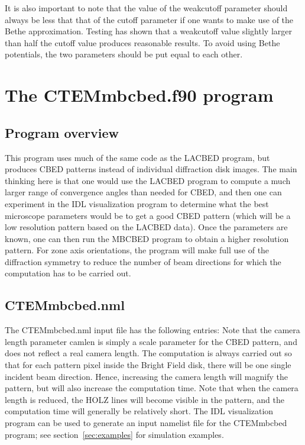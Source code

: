\documentclass[DIV=calc, paper=letter, fontsize=11pt]{scrartcl}	 %
\begin{document}
It is also important to note that the value of the \textsf{weakcutoff} parameter should always be less that
that of the \textsf{cutoff} parameter if one wants to make use of the Bethe approximation.  Testing has shown
that a \textsf{weakcutoff} value slightly larger than half the \textsf{cutoff} value produces reasonable 
results.  To avoid using Bethe potentials, the two parameters should be put equal to each other.

\section{The \protect\textsf{CTEMmbcbed.f90} program\label{sec:f90}}

\subsection{Program overview\label{sec:f90overview}}
This program uses much of the same code as the LACBED program, but produces CBED patterns 
instead of individual diffraction disk images.  The main thinking here is that one would 
use the LACBED program to compute a much larger range of convergence angles than needed 
for CBED, and then one can experiment in the IDL visualization program to determine what the best 
microscope parameters would be to get a good CBED pattern (which will be a low resolution
pattern based on the LACBED data).  Once the parameters are known, one can then run the 
MBCBED program to obtain a higher resolution pattern.  For zone axis orientations, the 
program will make full use of the diffraction symmetry to reduce the number of beam directions
for which the computation has to be carried out.

\subsection{CTEMmbcbed.nml\label{sec:f90input1}}
The \textsf{CTEMmbcbed.nml} input file has the following entries:
Note that the camera length parameter \textsf{camlen} is simply a scale parameter
for the CBED pattern, and does not reflect a real camera length.  The computation is
always carried out so that for each pattern pixel inside the Bright Field disk, there 
will be one single incident beam direction.  Hence, increasing the camera length will
magnify the pattern, but will also increase the computation time.  Note that when 
the camera length is reduced, the HOLZ lines will become visible in the pattern, and the 
computation time will generally be relatively short.  The IDL visualization program can be used to generate 
an input namelist file for the \textsf{CTEMmbcbed} program; see section~\ref{sec:examples} for simulation
examples.
\end{document}
